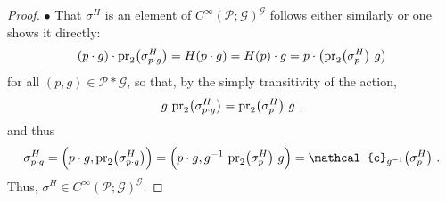 \documentclass[reqno,a4paper,oneside]{amsart}
\theoremstyle{plain}
\theoremstyle{remark}
\theoremstyle{definition}
\begin{document}
\begin{proof}

$\bullet$ That $\sigma^H$ is an element of $C^\infty(\mathcal{P};\mathcal{G})^{\mathcal{G}}$ follows either similarly or one shows it directly:
\begin{equation*}
(p \cdot g) \cdot \mathrm{pr}_2\mleft(\sigma^H_{p \cdot g}\mright)
=
H(p \cdot g)
=
H(p) \cdot g
=
p \cdot \mleft(\mathrm{pr}_2\mleft(\sigma^H_p\mright) ~ g \mright)
\end{equation*}
for all $(p, g) \in \mathcal{P}*\mathcal{G}$,
so that, by the simply transitivity of the action,
\begin{equation*}
g ~ \mathrm{pr}_2\mleft(\sigma^H_{p \cdot g}\mright)
=
\mathrm{pr}_2\mleft(\sigma^H_p\mright) ~ g~,
\end{equation*}
and thus
\begin{equation*}
\sigma^H_{p \cdot g}
=
\Bigl( p \cdot g, \mathrm{pr}_2\mleft(\sigma^H_{p \cdot g}\mright) \Bigr)
=
\Bigl( p \cdot g, g^{-1} ~ \mathrm{pr}_2\mleft(\sigma^H_p\mright) ~ g \Bigr)
=
\mathcal{c}_{g^{-1}}\mleft( \sigma^H_p \mright)~.
\end{equation*}
Thus, $\sigma^H \in C^\infty(\mathcal{P}; \mathcal{G})^{\mathcal{G}}$.


\end{proof}
\end{document}
